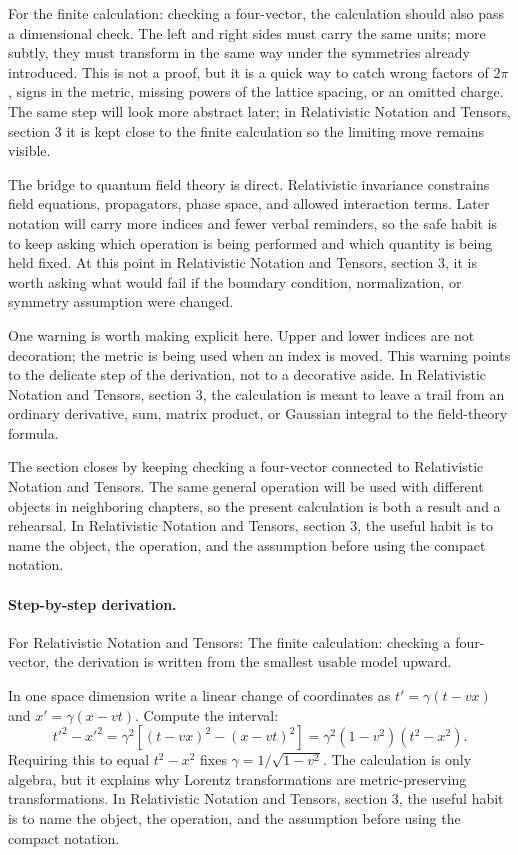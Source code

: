 For the finite calculation: checking a four-vector, the calculation should also pass a dimensional check.  The left and right sides must carry the same units; more subtly, they must transform in the same way under the symmetries already introduced.  This is not a proof, but it is a quick way to catch wrong factors of \(2\pi\), signs in the metric, missing powers of the lattice spacing, or an omitted charge.  The same step will look more abstract later; in Relativistic Notation and Tensors, section 3 it is kept close to the finite calculation so the limiting move remains visible.

The bridge to quantum field theory is direct.  Relativistic invariance constrains field equations, propagators, phase space, and allowed interaction terms.  Later notation will carry more indices and fewer verbal reminders, so the safe habit is to keep asking which operation is being performed and which quantity is being held fixed.  At this point in Relativistic Notation and Tensors, section 3, it is worth asking what would fail if the boundary condition, normalization, or symmetry assumption were changed.

One warning is worth making explicit here.  Upper and lower indices are not decoration; the metric is being used when an index is moved.  This warning points to the delicate step of the derivation, not to a decorative aside.  In Relativistic Notation and Tensors, section 3, the calculation is meant to leave a trail from an ordinary derivative, sum, matrix product, or Gaussian integral to the field-theory formula.

The section closes by keeping checking a four-vector connected to Relativistic Notation and Tensors.  The same general operation will be used with different objects in neighboring chapters, so the present calculation is both a result and a rehearsal.  In Relativistic Notation and Tensors, section 3, the useful habit is to name the object, the operation, and the assumption before using the compact notation.



\paragraph{Step-by-step derivation.}

For Relativistic Notation and Tensors: The finite calculation: checking a four-vector, the derivation is written from the smallest usable model upward.

In one space dimension write a linear change of coordinates as \(t'=\gamma(t-vx)\) and \(x'=\gamma(x-vt)\).  Compute the interval:
\[
  t'^2-x'^2
  =
  \gamma^2[(t-vx)^2-(x-vt)^2]
  =
  \gamma^2(1-v^2)(t^2-x^2).
\]
Requiring this to equal \(t^2-x^2\) fixes \(\gamma=1/\sqrt{1-v^2}\).  The calculation is only algebra, but it explains why Lorentz transformations are metric-preserving transformations.  In Relativistic Notation and Tensors, section 3, the useful habit is to name the object, the operation, and the assumption before using the compact notation.

